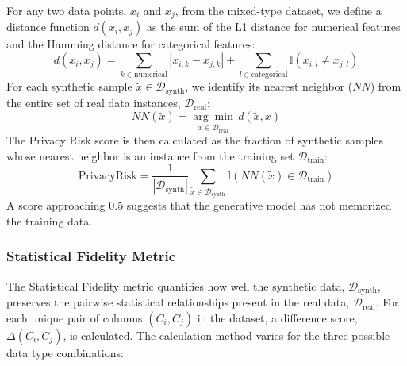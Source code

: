 For any two data points, $x_i$ and $x_j$, from the mixed-type dataset, we define a distance function $d(x_i, x_j)$ as the sum of the L1 distance for numerical features and the Hamming distance for categorical features:
\begin{equation}
    d(x_i, x_j) = \sum_{k \in \text{numerical}} |x_{i,k} - x_{j,k}| + \sum_{l \in \text{categorical}} \mathbb{I}(x_{i,l} \neq x_{j,l})
\end{equation}
For each synthetic sample $\tilde{x} \in \mathcal{D}_{\text{synth}}$, we identify its nearest neighbor ($NN$) from the entire set of real data instances, $\mathcal{D}_{\text{real}}$:
\begin{equation}
    NN(\tilde{x}) = \underset{x \in \mathcal{D}_{\text{real}}}{\arg\min} \, d(\tilde{x}, x)
\end{equation}
The Privacy Risk score is then calculated as the fraction of synthetic samples whose nearest neighbor is an instance from the training set $\mathcal{D}_{\text{train}}$:
\begin{equation}
    \text{PrivacyRisk} = \frac{1}{|\mathcal{D}_{\text{synth}}|} \sum_{\tilde{x} \in \mathcal{D}_{\text{synth}}} \mathbb{I}(NN(\tilde{x}) \in \mathcal{D}_{\text{train}})
\end{equation}
A score approaching 0.5 suggests that the generative model has not memorized the training data.

\subsubsection{Statistical Fidelity Metric}
\label{app:fidelity_metric}
The Statistical Fidelity metric quantifies how well the synthetic data, $\mathcal{D}_{\text{synth}}$, preserves the pairwise statistical relationships present in the real data, $\mathcal{D}_{\text{real}}$. For each unique pair of columns $(C_i, C_j)$ in the dataset, a difference score, $\Delta(C_i, C_j)$, is calculated. The calculation method varies for the three possible data type combinations:


